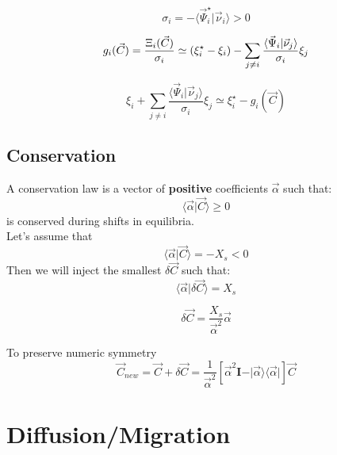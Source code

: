 \documentclass[aps,12pt]{revtex4}
\begin{document}
\begin{equation}
 \sigma_i = - \langle \vec \Psi_i^\star \vert \vec \nu_i \rangle > 0
\end{equation}
	
\begin{equation}
	g_i(\vec C) = \dfrac{\Xi_i(\vec C) }{\sigma_i} \simeq (\xi_i^\star - \xi_i) - \sum_{j\not=i}  \dfrac{\langle \vec \Psi_i \vert \vec \nu_j \rangle}{\sigma_i} \xi_j\\
\end{equation}
	
\begin{equation}
	\xi_i + \sum_{j\not=i}  \dfrac{\langle \vec \Psi_i \vert \vec \nu_j \rangle}{\sigma_i} \xi_j \simeq \xi_i^\star - g_i(\vec{C})
\end{equation}
	
\subsection{Conservation}

A conservation law is a vector of {\bf positive} coefficients $\vec \alpha$ such that:
\begin{equation}
	\langle \vec \alpha \vert \vec C \rangle \geq 0
\end{equation}
is conserved during shifts in equilibria.\\
Let's assume that
\begin{equation}
	\langle \vec \alpha \vert \vec C \rangle = -X_s < 0 
\end{equation}
Then we will inject the smallest $\delta \vec C$ such that:
\begin{equation}
	\langle \vec \alpha \vert \delta \vec C \rangle = X_s
\end{equation}

\begin{equation}
	\delta \vec C = \dfrac{X_s}{\vec\alpha^2} \vec{\alpha}
\end{equation}

To preserve numeric symmetry
\begin{equation}
	\vec C_{new} = \vec C + \delta \vec C = \dfrac{1}{\vec \alpha^2}\left[\vec \alpha^2 \bm{I} - \vert \vec \alpha \rangle \langle \vec \alpha \vert \right] \vec C
\end{equation}

 	

\section{Diffusion/Migration}
\end{document}
